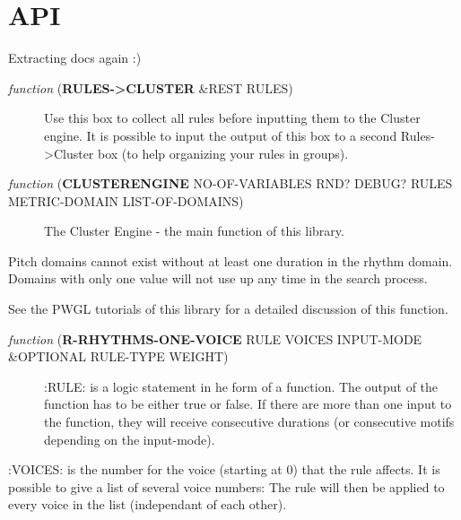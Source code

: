 
\section*{API}
\label{sec:org57022d3}

Extracting docs again :)

\begin{description}
\item[{\emph{function} (\textbf{RULES->CLUSTER} \&REST RULES)}] Use this box to collect all rules before inputting them to the Cluster engine. It is possible to input the output of this box to a second Rules->Cluster box (to help organizing your rules in groups).
\end{description}

\begin{description}
\item[{\emph{function} (\textbf{CLUSTERENGINE} NO-OF-VARIABLES RND? DEBUG? RULES METRIC-DOMAIN LIST-OF-DOMAINS)}] The Cluster Engine - the main function of this library.
\end{description}

Pitch domains cannot exist without at least one duration in the rhythm domain. Domains with only one value will not use up any time in the search process.

See the PWGL tutorials of this library for a detailed discussion of this function.

\begin{description}
\item[{\emph{function} (\textbf{R-RHYTHMS-ONE-VOICE} RULE VOICES INPUT-MODE \&OPTIONAL RULE-TYPE WEIGHT)}] :RULE: is a logic statement in he form of a function. The output of the function has to be either true or false. If there are more than one input to the function, they will receive consecutive durations (or consecutive motifs depending on the input-mode).
\end{description}

:VOICES: is the number for the voice (starting at 0) that the rule affects. It is possible to give a list of several voice numbers: The rule will then be applied to every voice in the list (independant of each other).

